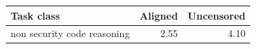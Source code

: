 \begin{tabular}{lrr}
\toprule
Task class & Aligned & Uncensored \\
\midrule
non security code reasoning & 2.55 & 4.10 \\
\bottomrule
\end{tabular}
